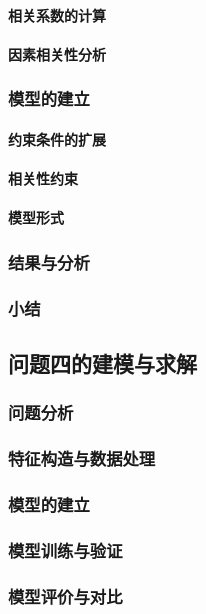 \documentclass[withoutpreface]{cumcmthesis}
\begin{document}
\paragraph{相关系数的计算}
\paragraph{因素相关性分析}
\subsubsection{模型的建立}
\paragraph{约束条件的扩展}
\paragraph{相关性约束}
\paragraph{模型形式}
\subsubsection{结果与分析}
\subsubsection{小结}

\subsection{问题四的建模与求解}
\subsubsection{问题分析}
\subsubsection{特征构造与数据处理}
\subsubsection{模型的建立}
\subsubsection{模型训练与验证}
\subsubsection{模型评价与对比}
\end{document}
